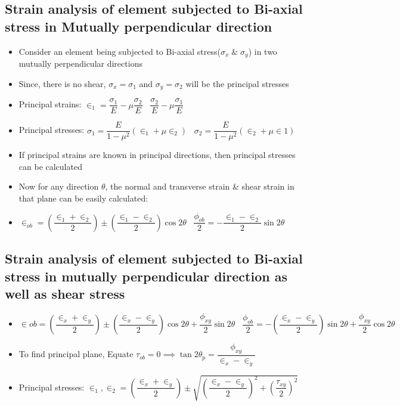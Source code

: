 \documentclass[8pt]{report}
\begin{document}
	\subsection{Strain analysis of element subjected to Bi-axial stress in Mutually perpendicular direction}
		\begin{itemize}
			\item Consider an element being subjected to Bi-axial stress($\sigma_x\;\&\;\sigma_y$) in two mutually perpendicular directions
			\item Since, there is no shear, $\sigma_x=\sigma_1$ and $\sigma_y=\sigma_2$ will be the principal stresses
			\item Principal strains: $\boxed{\in_1=\dfrac{\sigma_1}{E}-\mu\dfrac{\sigma_2}{E}}\;\;\;\boxed{\dfrac{\sigma_2}{E}-\mu\dfrac{\sigma_1}{E}}$ 
			\item Principal stresses: $\boxed{\sigma_1 = \dfrac{E}{1-\mu^2}(\in_1+\mu\in_2)}\;\;\;\boxed{\sigma_2 = \dfrac{E}{1-\mu^2}(\in_2+\mu\in1)}$
			\item If principal strains are known in principal directions, then principal stresses can be calculated
			\item Now for any direction $\theta$, the normal and transverse strain \& shear strain in that plane can be easily calculated:
			\item $\boxed{\in_{ob} = \left(\dfrac{\in_1+\in_2}{2}\right)\pm\left(\dfrac{\in_1-\in_2}{2}\right)\cos 2\theta}\;\;\;\boxed{\dfrac{\phi_{ob}}{2}=-\dfrac{\in_1-\in_2}{2}\sin 2\theta}$
		\end{itemize}\hrulefill
	\subsection{Strain analysis of element subjected to Bi-axial stress in mutually perpendicular direction as well as shear stress}
		\begin{itemize}
			\item $\boxed{\in{ob} = \left(\dfrac{\in_x+\in_y}{2}\right)\pm \left(\dfrac{\in_x-\in_y}{2}\right)\cos 2\theta+\dfrac{\phi_{xy}}{2}\sin 2\theta}\;\;\;\boxed{\dfrac{\phi_{ob}}{2} = -\left(\dfrac{\in_x-\in_y}{2}\right)\sin 2\theta+\dfrac{\phi_{xy}}{2}\cos 2\theta}$
			\item To find principal plane, Equate $\tau_{ob} = 0 \implies \boxed{\tan 2\theta_p = \dfrac{\phi_{xy}}{\in_x-\in_y}}$
			\item Principal stresses: $\boxed{\in_1,\in_2 = \left(\dfrac{\in_x+\in_y}{2}\right)\pm\sqrt{\left(\dfrac{\in_x-\in_y}{2}\right)^2+\left(\dfrac{\tau_{xy}}{2}\right)^2}}$
		\end{itemize}\hrulefill
\end{document}

